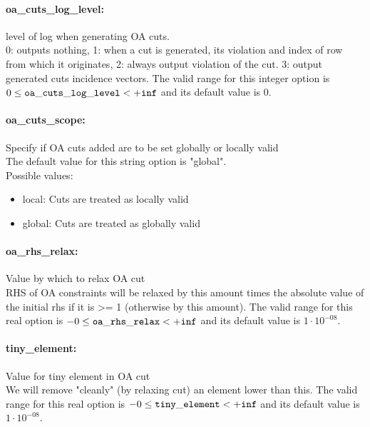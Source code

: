 \paragraph{oa\_cuts\_log\_level:}\label{sec:oa_cuts_log_level} level of log when generating OA cuts. $\;$ \\
 0: outputs nothing,
1: when a cut is generated,
its violation and index of row from which it
originates,
2: always output violation of the
cut.
3: output generated cuts incidence vectors. The valid range for this integer option is
$0 \le {\tt oa\_cuts\_log\_level } <  {\tt +inf}$
and its default value is $0$.


\paragraph{oa\_cuts\_scope:}\label{sec:oa_cuts_scope} Specify if OA cuts added are to be set globally or locally valid $\;$ \\

The default value for this string option is "global".
\\ 
Possible values:
\begin{itemize}
   \item local: Cuts are treated as locally valid
   \item global: Cuts are treated as globally valid
\end{itemize}

\paragraph{oa\_rhs\_relax:}\label{sec:oa_rhs_relax} Value by which to relax OA cut $\;$ \\
 RHS of OA constraints will be relaxed by this
amount times the absolute value of the initial
rhs if it is >= 1 (otherwise by this amount). The valid range for this real option is 
$-0 \le {\tt oa\_rhs\_relax } <  {\tt +inf}$
and its default value is $1 \cdot 10^{-08}$.


\paragraph{tiny\_element:}\label{sec:tiny_element} Value for tiny element in OA cut $\;$ \\
 We will remove "cleanly" (by relaxing cut) an
element lower than this. The valid range for this real option is 
$-0 \le {\tt tiny\_element } <  {\tt +inf}$
and its default value is $1 \cdot 10^{-08}$.


